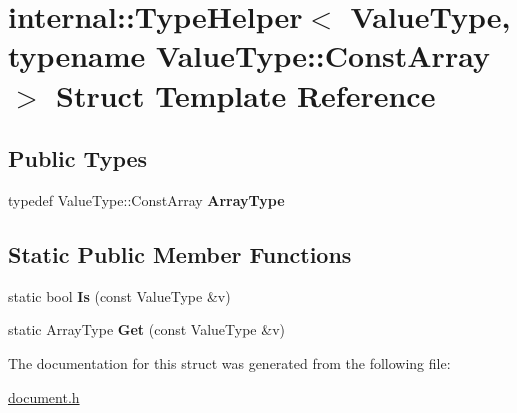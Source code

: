 \hypertarget{a00318}{}\section{internal\+:\+:Type\+Helper$<$ Value\+Type, typename Value\+Type\+:\+:Const\+Array $>$ Struct Template Reference}
\label{a00318}
\subsection*{Public Types}
\begin{DoxyCompactItemize}
\item 
typedef Value\+Type\+::\+Const\+Array {\bfseries Array\+Type}\hypertarget{a00318_a88c3a7bbff09fdd44ce6980f8122ba05}{}\label{a00318_a88c3a7bbff09fdd44ce6980f8122ba05}

\end{DoxyCompactItemize}
\subsection*{Static Public Member Functions}
\begin{DoxyCompactItemize}
\item 
static bool {\bfseries Is} (const Value\+Type \&v)\hypertarget{a00318_a259497292f89c58789b1e947249dd299}{}\label{a00318_a259497292f89c58789b1e947249dd299}

\item 
static Array\+Type {\bfseries Get} (const Value\+Type \&v)\hypertarget{a00318_a247811db25d6f25cc63175e03d847b8b}{}\label{a00318_a247811db25d6f25cc63175e03d847b8b}

\end{DoxyCompactItemize}


The documentation for this struct was generated from the following file\+:\begin{DoxyCompactItemize}
\item 
\hyperlink{a00473}{document.\+h}\end{DoxyCompactItemize}
